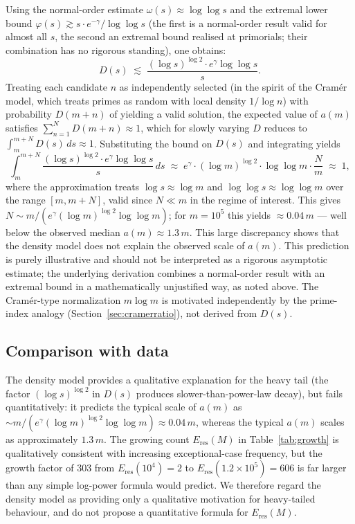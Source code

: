\documentclass[pdflatex,sn-mathphys-num,Numbered]{sn-jnl}
\theoremstyle{thmstyleone}
\theoremstyle{thmstylethree}
\theoremstyle{thmstyletwo}
\numberwithin{equation}{section}
\begin{document}
Using the normal-order estimate $\omega(s) \approx \log\log s$
\cite{HardyRamanujan} and the extremal lower bound
$\varphi(s) \gtrsim s \cdot e^{-\gamma}/\log\log s$
\cite{Mertens}
(the first is a normal-order result valid for almost all $s$, the
second an extremal bound realised at primorials; their combination
has no rigorous standing), one obtains:
\[
D(s) \;\lesssim\;
\frac{(\log s)^{\log 2} \cdot e^{\gamma} \log\log s}{s}.
\]
Treating each candidate $n$ as independently selected
(in the spirit of the Cram\'er model, which treats primes as random
with local density $1/\log n$)
with probability $D(m+n)$ of yielding a valid solution,
the expected value of $a(m)$
satisfies $\sum_{n=1}^{N} D(m+n) \approx 1$, which for slowly varying
$D$ reduces to $\int_m^{m+N} D(s)\,ds \approx 1$.
Substituting the bound on $D(s)$ and integrating yields
\[
\int_m^{m+N} \frac{(\log s)^{\log 2} \cdot e^{\gamma} \log\log s}{s}
\,ds
\;\approx\;
e^{\gamma} \cdot (\log m)^{\log 2} \cdot \log\log m
\cdot \frac{N}{m}
\;\approx\; 1,
\]
where the approximation treats $\log s \approx \log m$ and
$\log\log s \approx \log\log m$ over the range $[m, m+N]$, valid
since $N \ll m$ in the regime of interest.
This gives $N \sim m/(e^{\gamma} (\log m)^{\log 2} \log\log m)$;
for $m = 10^5$ this yields
$\approx 0.04\,m$ --- well below the observed median
$a(m) \approx 1.3\,m$.
This large discrepancy shows that the density model does not explain
the observed scale of $a(m)$.
This prediction is purely illustrative and should not be interpreted
as a rigorous asymptotic estimate; the underlying derivation combines
a normal-order result with an extremal bound in a mathematically
unjustified way, as noted above.
The Cram\'er-type normalization
$m\log m$ is motivated independently by the prime-index analogy
(Section~\ref{sec:cramerratio}), not derived from $D(s)$.

\subsection{Comparison with data}
\label{sec:comparison}

The density model provides a qualitative explanation for the heavy tail
(the factor $(\log s)^{\log 2}$ in $D(s)$ produces slower-than-power-law
decay), but fails quantitatively: it predicts the typical scale of
$a(m)$ as $\sim m/(e^{\gamma} (\log m)^{\log 2} \log\log m)
\approx 0.04\,m$, whereas the typical $a(m)$ scales as
approximately $1.3\,m$.
The growing count $E_{\mathrm{res}}(M)$ in Table~\ref{tab:growth} is
qualitatively consistent with increasing exceptional-case frequency,
but the growth factor of $303$ from $E_{\mathrm{res}}(10^4) = 2$ to
$E_{\mathrm{res}}(1.2 \times 10^5) = 606$ is far larger than any simple
log-power formula would predict.
We therefore regard the density model as providing only a qualitative
motivation for heavy-tailed behaviour, and do not propose a
quantitative formula for $E_{\mathrm{res}}(M)$.
\end{document}
